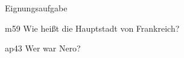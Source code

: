 \documentclass[11pt,lsg]{teacher}
\begin{document}
\begin{aufgabe}[Mathe]{Eignungsaufgabe}
\begin{teilaufgabe}{m}{5}{9} \liniert
    Wie heißt die Hauptstadt von Frankreich?
\end{teilaufgabe}
    \begin{loesung}
    \end{loesung}
\begin{teilaufgabe}{ap}{4}{3} \kariert
    Wer war Nero?
\end{teilaufgabe}
    \begin{loesung}
    \end{loesung}
\end{aufgabe}







\end{document}

